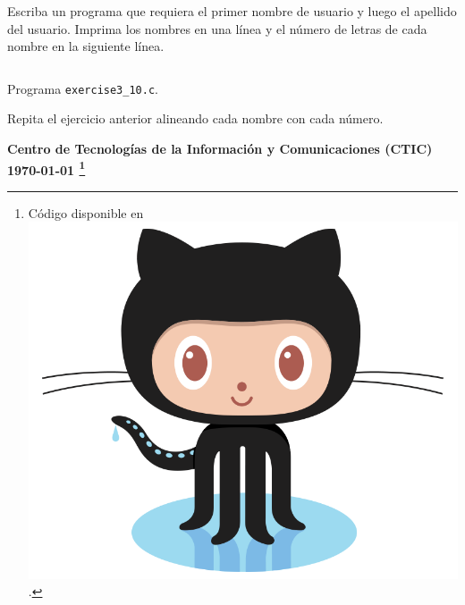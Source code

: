 \documentclass[spanish,addpoints,answers,a4paper]{exam}
\newcommand{\unmarkedfntext}[1]{%
	\begingroup
	\renewcommand\thefootnote{}\footnote{#1}%
	\addtocounter{footnote}{-1}%
	\endgroup
}
\newcommand{\mychar}{%
	\begingroup\normalfont
	\includegraphics[height=\fontcharht\font`\B]{Octocat.png}%
	\endgroup
}
\begin{document}
\begin{questions}
\question Escriba un programa que requiera el primer nombre de usuario y luego el apellido del usuario. Imprima los nombres en una línea y el número de letras de cada nombre en la siguiente línea.

\begin{solution}
\begin{listing}[H]
\footnotesize
\inputminted{c}{exercise3_10.c}
\caption{Programa \texttt{exercise3\_10.c}.}
\label{lst:3.10}
\end{listing}
\end{solution}

\question Repita el ejercicio anterior alineando cada nombre con cada número.

\begin{solution}
	
\end{solution}

\end{questions}

\begin{flushright}\bfseries
Centro de Tecnologías de la Información y Comunicaciones (CTIC)\\[2mm]
\today\unmarkedfntext{Código disponible en \href{https://github.com/carlosal1015/C-Programming}{\mychar{}}.}
\end{flushright}
\end{document}
